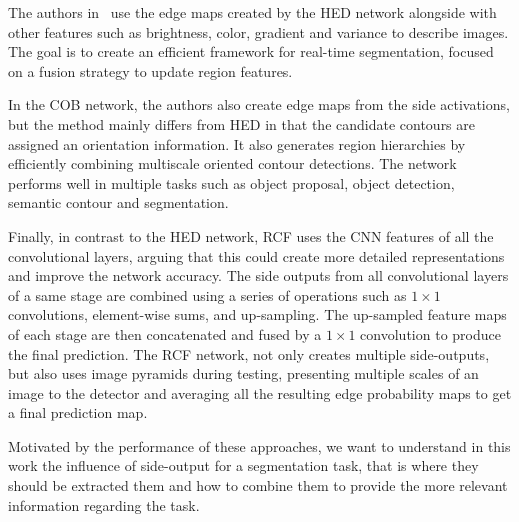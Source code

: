 The authors in~\cite{cheng2016} use the edge maps created by the HED network alongside with other features such as brightness, color, gradient and variance to describe images. The goal is to create an efficient framework for real-time segmentation, focused on a fusion strategy to update region features.


In the COB network, the authors also create edge maps from the side activations, but the method mainly differs from HED in that the candidate contours are assigned an orientation information. It also generates region hierarchies by efficiently combining multiscale oriented contour detections. The network performs well in multiple tasks such as object proposal, object detection, semantic contour and segmentation.


Finally, in contrast to the HED network, RCF uses the CNN features of all the convolutional layers, arguing that this could create more detailed representations and improve the network accuracy. The side outputs from all convolutional layers of a same stage are combined using a series of operations such as $1\times1$ convolutions, element-wise sums, and up-sampling. The up-sampled feature maps of each stage are then concatenated and fused by a $1\times1$ convolution to produce the final prediction. The RCF network, not only creates multiple side-outputs, but also uses image pyramids during testing, presenting multiple scales of an image to the detector and averaging all the resulting edge probability maps to get a final prediction map. 

Motivated by the performance of these approaches, we want to understand in this work the influence of side-output for a segmentation task, that is where they should be extracted them and how to combine them to provide the more relevant information regarding the task.

